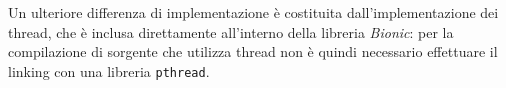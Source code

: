 Un ulteriore differenza di implementazione è costituita dall'implementazione
dei thread, che è inclusa direttamente all'interno della libreria \textit{Bionic}:
per la compilazione di sorgente che utilizza thread non è quindi necessario
effettuare il linking con una libreria \texttt{\small pthread}.


